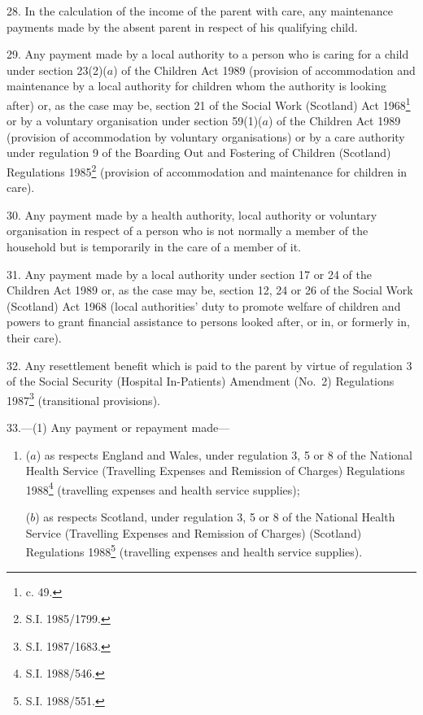 \documentclass[12pt,a4paper]{article}
\begin{document}
\medskip

28.  In the calculation of the income of the parent with care, any maintenance payments made by the absent parent in respect of his qualifying child.

\medskip

29.  Any payment made by a local authority to a person who is caring for a child under section 23(2)($a$) of the Children Act 1989 (provision of accommodation and maintenance by a local authority for children whom the authority is looking after) or, as the case may be, section 21 of the Social Work (Scotland) Act 1968\footnote{ c. 49.} or by a voluntary organisation under section 59(1)($a$) of the Children Act 1989 (provision of accommodation by voluntary organisations) or by a care authority under regulation 9 of the Boarding Out and Fostering of Children (Scotland) Regulations 1985\footnote{\frenchspacing S.I. 1985/1799.} (provision of accommodation and maintenance for children in care).

\medskip

30.  Any payment made by a health authority, local authority or voluntary organisation in respect of a person who is not normally a member of the household but is temporarily in the care of a member of it.

\medskip

31.  Any payment made by a local authority under section 17 or 24 of the Children Act 1989 or, as the case may be, section 12, 24 or 26 of the Social Work (Scotland) Act 1968 (local authorities' duty to promote welfare of children and powers to grant financial assistance to persons looked after, or in, or formerly in, their care).

\medskip

32.  Any resettlement benefit which is paid to the parent by virtue of regulation 3 of the Social Security (Hospital In-Patients) Amendment (No.\ 2) Regulations 1987\footnote{\frenchspacing S.I. 1987/1683.} (transitional provisions).

\medskip

33.—(1) Any payment or repayment made—
\begin{enumerate}\item[]
($a$) as respects England and Wales, under regulation 3, 5 or 8 of the National Health Service (Travelling Expenses and Remission of Charges) Regulations 1988\footnote{\frenchspacing S.I. 1988/546.} (travelling expenses and health service supplies);

($b$) as respects Scotland, under regulation 3, 5 or 8 of the National Health Service (Travelling Expenses and Remission of Charges) (Scotland) Regulations 1988\footnote{\frenchspacing S.I. 1988/551.} (travelling expenses and health service supplies).
\end{enumerate}
\end{document}
